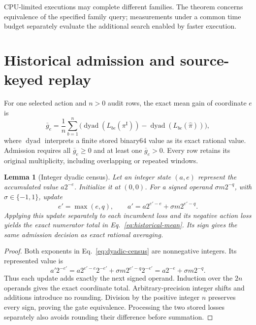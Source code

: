 \documentclass[11pt]{article}
\newtheorem{lemma}{Lemma}
\newcommand{\inc}{\pi^{\mathrm I}}
\newcommand{\act}{\widehat\pi}
\begin{document}
CPU-limited executions may complete different families. The theorem concerns equivalence of the specified family query; measurements under a common time budget separately evaluate the additional search enabled by faster execution.

\section{Historical admission and source-keyed replay}
For one selected action and $n>0$ audit rows, the exact mean gain of coordinate $e$ is
\begin{equation}
\bar g_e=\frac1n\sum_{b=1}^n\bigl(\operatorname{dyad}(L_{be}(\inc))-\operatorname{dyad}(L_{be}(\act))\bigr),
\label{eq:historical-mean}
\end{equation}
where $\operatorname{dyad}$ interprets a finite stored binary64 value as its exact rational value. Admission requires all $\bar g_e\ge0$ and at least one $\bar g_e>0$. Every row retains its original multiplicity, including overlapping or repeated windows.

\begin{lemma}[Integer dyadic census]\label{lem:dyadic}
Let an integer state $(a,e)$ represent the accumulated value $a2^{-e}$. Initialize it at $(0,0)$. For a signed operand $\sigma m2^{-q}$, with $\sigma\in\{-1,1\}$, update
\begin{equation}
e'=\max(e,q),\qquad a'=a2^{e'-e}+\sigma m2^{e'-q}.
\label{eq:dyadic-census}
\end{equation}
Applying this update separately to each incumbent loss and its negative action loss yields the exact numerator total in Eq.~\eqref{eq:historical-mean}. Its sign gives the same admission decision as exact rational averaging.
\end{lemma}
\begin{proof}
Both exponents in Eq.~\eqref{eq:dyadic-census} are nonnegative integers. Its represented value is
\begin{equation}
a'2^{-e'}=a2^{e'-e}2^{-e'}+\sigma m2^{e'-q}2^{-e'}=a2^{-e}+\sigma m2^{-q}.
\end{equation}
Thus each update adds exactly the next signed operand. Induction over the $2n$ operands gives the exact coordinate total. Arbitrary-precision integer shifts and additions introduce no rounding. Division by the positive integer $n$ preserves every sign, proving the gate equivalence. Processing the two stored losses separately also avoids rounding their difference before summation.
\end{proof}
\end{document}

